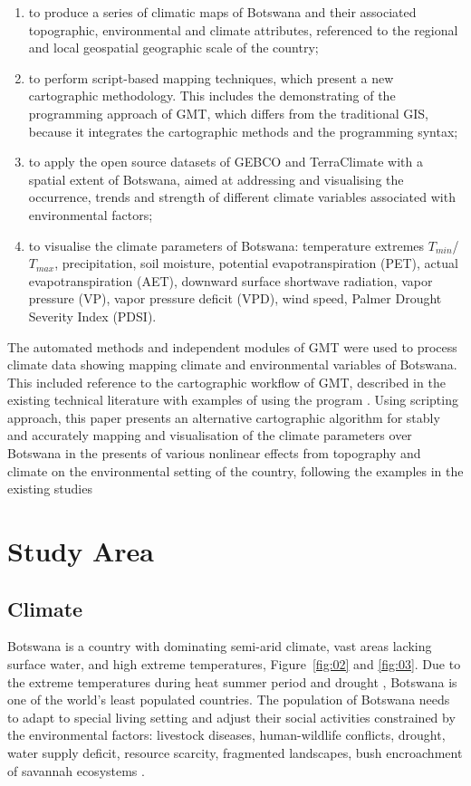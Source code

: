 \documentclass[ijgi,article,submit,pdftex,moreauthors]{Definitions/mdpi}
\begin{document}
\begin{enumerate}[label=\roman*]
	\item	to produce a series of climatic maps of Botswana and their associated topographic, environmental and climate attributes, referenced to the regional and local geospatial geographic scale of the country; 
	\item to perform script-based mapping techniques, which present a new cartographic methodology. This includes the demonstrating of the programming approach of GMT, which differs from the traditional GIS,  because it integrates the cartographic methods and the programming syntax;
	\item to apply the open source datasets of GEBCO and TerraClimate with a spatial extent of Botswana, aimed at addressing and visualising the occurrence, trends and strength of different climate variables associated with environmental factors;
	\item to visualise the climate parameters of Botswana: temperature extremes $T_{min}$/$T_{max}$, precipitation, soil moisture, potential evapotranspiration (PET), actual evapotranspiration (AET), downward surface shortwave radiation, vapor pressure (VP), vapor pressure deficit (VPD), wind speed, Palmer Drought Severity Index (PDSI).
\end{enumerate}
    
The automated methods and independent modules of GMT were used to process climate data showing mapping climate and environmental variables of Botswana. This included reference to the cartographic workflow of GMT, described in the existing technical literature with examples of using the program \cite{Kasalica,Lemenkova2019106,8588718,Lemenkova202205,4814952,Lemenkova201994}. Using scripting approach, this paper presents an alternative cartographic algorithm for stably and accurately mapping and visualisation of the climate parameters over Botswana in the presents of various nonlinear effects from topography and climate on the environmental setting of the country, following the examples in the existing studies \cite{6049609,5649810}

\section{Study Area}

\subsection{Climate}
Botswana is a country with dominating semi-arid climate, vast areas lacking surface water, and high extreme temperatures, Figure~\ref{fig:02} and \ref{fig:03}. Due to the extreme temperatures during heat summer period and drought \cite{Hemming,Karikari}, Botswana is one of the world’s least populated countries. The population of Botswana needs to adapt to special living setting and adjust their social activities constrained by the environmental factors: livestock diseases, human-wildlife conflicts, drought, water supply deficit, resource scarcity, fragmented landscapes, bush encroachment of savannah ecosystems \cite{Badimo,Basupi,Charis}. 
    
\end{document}
